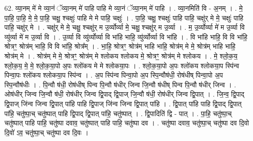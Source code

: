 \documentclass[17pt]{extarticle}
\begin{document}
62. व्या॒नम् मे॑ मे व्या॒नं ॅव्या॒नम् मे॑ पाहि पाहि मे व्या॒नं ॅव्या॒नम् मे॑ पाहि । . व्या॒नमिति॑ वि - अ॒नम् । . मे॒ पा॒हि॒ पा॒हि॒ मे॒ मे॒ पा॒हि॒ चक्षु॒ श्चक्षुः॑ पाहि मे मे पाहि॒ चक्षुः॑ । . पा॒हि॒ चक्षु॒ श्चक्षुः॑ पाहि पाहि॒ चक्षु॑र् मे मे॒ चक्षुः॑ पाहि पाहि॒ चक्षु॑र् मे । . चक्षु॑र् मे मे॒ चक्षु॒ श्चक्षु॑र् म उ॒र्व्योर्व्या मे॒ चक्षु॒ श्चक्षु॑र् म उ॒र्व्या । . म॒ उ॒र्व्योर्व्या मे॑ म उ॒र्व्या वि व्यु॑र्व्या मे॑ म उ॒र्व्या वि । . उ॒र्व्या वि व्यु॑र्व्योर्व्या वि भा॑हि भाहि॒ व्यु॑र्व्योर्व्या वि भा॑हि । . वि भा॑हि भाहि॒ वि वि भा॑हि॒ श्रोत्रꣳ॒॒ श्रोत्र॑म् भाहि॒ वि वि भा॑हि॒ श्रोत्र᳚म् । . भा॒हि॒ श्रोत्रꣳ॒॒ श्रोत्र॑म् भाहि भाहि॒ श्रोत्र॑म् मे मे॒ श्रोत्र॑म् भाहि भाहि॒ श्रोत्र॑म् मे । . श्रोत्र॑म् मे मे॒ श्रोत्रꣳ॒॒ श्रोत्र॑म् मे श्लोकय श्लोकय मे॒ श्रोत्रꣳ॒॒ श्रोत्र॑म् मे श्लोकय । . मे॒ श्लो॒क॒य॒ श्लो॒क॒य॒ मे॒ मे॒ श्लो॒क॒या॒पो अ॒पः श्लो॑कय मे मे श्लोकया॒पः । . श्लो॒क॒या॒पो अ॒पः श्लो॑कय श्लोकया॒प स्पि॑न्व पिन्वा॒पः श्लो॑कय श्लोकया॒प स्पि॑न्व । . अ॒प स्पि॑न्व पिन्वा॒पो अ॒प स्पि॒न्वौष॑धी॒ रोष॑धीष् पिन्वा॒पो अ॒प स्पि॒न्वौष॑धीः । . पि॒न्वौ ष॑धी॒ रोष॑धीष् पिन्व पि॒न्वौ ष॑धीर् जिन्व जि॒न्वौ ष॑धीष् पिन्व पि॒न्वौ ष॑धीर् जिन्व । . ओष॑धीर् जिन्व जि॒न्वौ ष॑धी॒ रोष॑धीर् जिन्व द्वि॒पाद् द्वि॒पाज् जि॒न्वौ ष॑धी॒ रोष॑धीर् जिन्व द्वि॒पात् । . जि॒न्व॒ द्वि॒पाद् द्वि॒पाज् जि॑न्व जिन्व द्वि॒पात् पा॑हि पाहि द्वि॒पाज् जि॑न्व जिन्व द्वि॒पात् पा॑हि । . द्वि॒पात् पा॑हि पाहि द्वि॒पाद् द्वि॒पात् पा॑हि॒ चतु॑ष्पा॒च् चतु॑ष्पात् पाहि द्वि॒पाद् द्वि॒पात् पा॑हि॒ चतु॑ष्पात् । . द्वि॒पादिति॑ द्वि - पात् । . पा॒हि॒ चतु॑ष्पा॒च् चतु॑ष्पात् पाहि पाहि॒ चतु॑ष्पा दवाव॒ चतु॑ष्पात् पाहि पाहि॒ चतु॑ष्पा दव । . चतु॑ष्पा दवाव॒ चतु॑ष्पा॒च् चतु॑ष्पा दव दि॒वो दि॒वो॑ ऽव॒ चतु॑ष्पा॒च् चतु॑ष्पा दव दि॒वः । \newline
\end{document}
